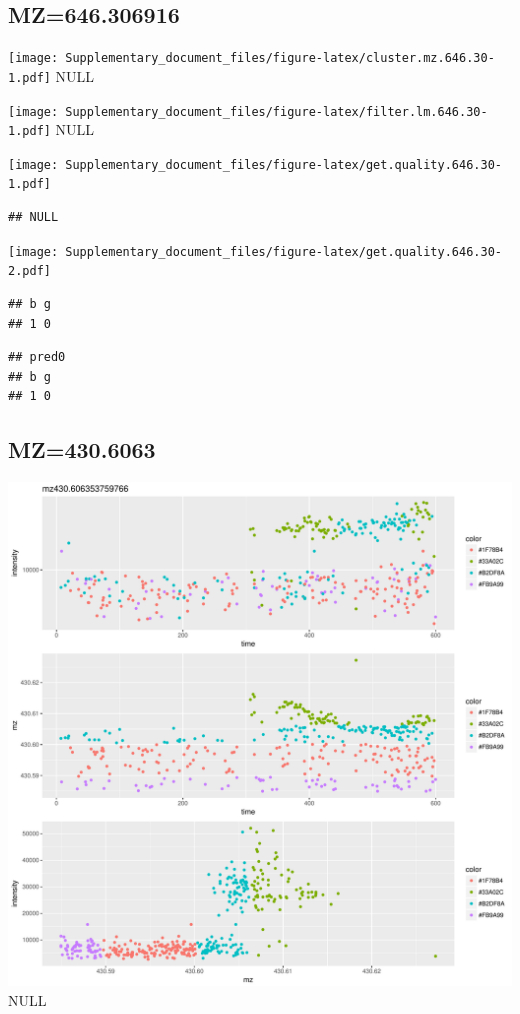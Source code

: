 \documentclass[]{article}
\begin{document}
\subsection{MZ=646.306916}\label{mz646.306916}

\texttt{[image: Supplementary\_document\_files/figure-latex/cluster.mz.646.30-1.pdf]}
NULL

\texttt{[image: Supplementary\_document\_files/figure-latex/filter.lm.646.30-1.pdf]}
NULL

\texttt{[image: Supplementary\_document\_files/figure-latex/get.quality.646.30-1.pdf]}

\begin{verbatim}
## NULL
\end{verbatim}

\texttt{[image: Supplementary\_document\_files/figure-latex/get.quality.646.30-2.pdf]}

\begin{verbatim}
## b g 
## 1 0
\end{verbatim}

\begin{verbatim}
## pred0
## b g 
## 1 0
\end{verbatim}

\subsection{MZ=430.6063}\label{mz430.6063}

\includegraphics{Supplementary_document_files/figure-latex/cluster.mz.430-1.pdf}
NULL
\end{document}
